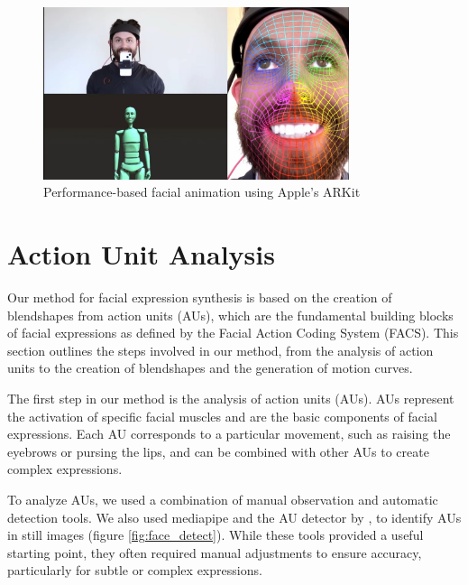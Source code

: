\documentclass[../../main.tex]{subfiles}
\begin{document}
\begin{figure}
    \centering
    \includegraphics[width=0.8\textwidth]{chapters/facial_expressions/images/motion_capture.jpg}
    \caption{Performance-based facial animation using Apple's ARKit}
    \label{fig:motion_capture}
\end{figure}

\section{Action Unit Analysis}
\label{ch:facial_expressions:action_unit_analysis}

Our method for facial expression synthesis is based on the creation of blendshapes from action units (AUs), which are the fundamental building blocks of facial expressions as defined by the Facial Action Coding System (FACS). This section outlines the steps involved in our method, from the analysis of action units to the creation of blendshapes and the generation of motion curves.

The first step in our method is the analysis of action units (AUs). AUs represent the activation of specific facial muscles and are the basic components of facial expressions. Each AU corresponds to a particular movement, such as raising the eyebrows or pursing the lips, and can be combined with other AUs to create complex expressions.

To analyze AUs, we used a combination of manual observation and automatic detection tools. We also used mediapipe and the AU detector by \cite{luo2022learning}, to identify AUs in still images (figure \ref{fig:face_detect}). While these tools provided a useful starting point, they often required manual adjustments to ensure accuracy, particularly for subtle or complex expressions.
\end{document}
